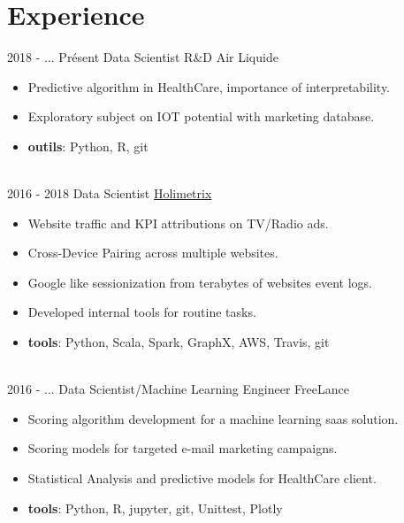 \documentclass[letterpaper]{twentysecondcv} %
\begin{document}
\makeprofile %



\section{Experience}{\faAlignJustify}

\begin{twenty} %
\twentyitem
    	{2018 - ...}
	{Pr\'esent}
         {Data Scientist R\&D}
         {Air Liquide}
        {}
        {
				\begin{itemize}
				\item Predictive algorithm in HealthCare, importance of interpretability.
				\item Exploratory subject on IOT potential with marketing database.
				\item \textbf{outils}: Python, R,  git
				\end{itemize} }\\

\twentyitem
    	{2016 - 2018}
		{}
        {Data Scientist}
        {\href{http://www.holimetrix.ccom/}{Holimetrix}}
        {}
        {\vspace{-2mm}\begin{itemize}[topsep=0pt,partopsep=0pt]
				\item  Website traffic and KPI attributions on TV/Radio ads.
				\item Cross-Device Pairing across multiple websites.
				\item Google like sessionization from terabytes of websites event logs.
				\item Developed internal tools for routine tasks.
				\item \textbf{tools}: Python, Scala, Spark, GraphX, AWS, Travis, git
				\end{itemize}} \\
				
	\twentyitem
    	{2016 - ...}
		{}
        {Data Scientist/Machine Learning Engineer}
        {FreeLance}
        {}
        {\vspace{-2mm}\begin{itemize}[topsep=0pt,partopsep=0pt]
        \item Scoring algorithm development for a machine learning saas solution.
        \item Scoring models for targeted e-mail marketing campaigns. 
        \item Statistical Analysis and predictive models for HealthCare client. 
				\item \textbf{tools}: Python, R, jupyter, git, Unittest, Plotly
    \end{itemize}} \\
		

\end{twenty}
\end{document}
